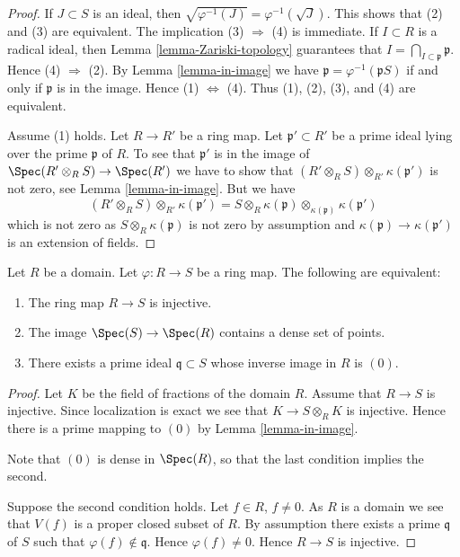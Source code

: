 \begin{proof}
If $J \subset S$ is an ideal, then
$\sqrt{\varphi^{-1}(J)} = \varphi^{-1}(\sqrt{J})$. This shows that (2)
and (3) are equivalent.
The implication (3) $\Rightarrow$ (4) is immediate.
If $I \subset R$ is a radical ideal, then
Lemma \ref{lemma-Zariski-topology}
guarantees that $I = \bigcap_{I \subset \mathfrak p} \mathfrak p$.
Hence (4) $\Rightarrow$ (2). By
Lemma \ref{lemma-in-image}
we have $\mathfrak p = \varphi^{-1}(\mathfrak p S)$ if and only if
$\mathfrak p$ is in the image. Hence (1) $\Leftrightarrow$ (4).
Thus (1), (2), (3), and (4) are equivalent.

\medskip\noindent
Assume (1) holds. Let $R \to R'$ be a ring map. Let
$\mathfrak p' \subset R'$ be a prime ideal lying over the prime
$\mathfrak p$ of $R$. To see that $\mathfrak p'$ is in the image
of $\Spec(R' \otimes_R S) \to \Spec(R')$ we have to show
that $(R' \otimes_R S) \otimes_{R'} \kappa(\mathfrak p')$ is not zero, see
Lemma \ref{lemma-in-image}.
But we have
$$
(R' \otimes_R S) \otimes_{R'} \kappa(\mathfrak p') =
S \otimes_R \kappa(\mathfrak p)
\otimes_{\kappa(\mathfrak p)} \kappa(\mathfrak p')
$$
which is not zero as $S \otimes_R \kappa(\mathfrak p)$ is not zero
by assumption and $\kappa(\mathfrak p) \to \kappa(\mathfrak p')$ is
an extension of fields.
\end{proof}

\begin{lemma}
\label{lemma-domain-image-dense-set-points-generic-point}
Let $R$ be a domain. Let $\varphi : R \to S$ be a ring map.
The following are equivalent:
\begin{enumerate}
\item The ring map $R \to S$ is injective.
\item The image $\Spec(S) \to \Spec(R)$
contains a dense set of points.
\item There exists a prime ideal $\mathfrak q \subset S$
whose inverse image in $R$ is $(0)$.
\end{enumerate}
\end{lemma}

\begin{proof}
Let $K$ be the field of fractions of the domain $R$.
Assume that $R \to S$ is injective. Since localization
is exact we see that $K \to S \otimes_R K$ is injective.
Hence there is a prime mapping to $(0)$ by
Lemma \ref{lemma-in-image}.

\medskip\noindent
Note that $(0)$ is dense in $\Spec(R)$, so that the
last condition implies the second.

\medskip\noindent
Suppose the second condition holds. Let $f \in R$,
$f \not = 0$. As $R$ is a domain we see that $V(f)$
is a proper closed subset of $R$. By assumption
there exists a prime $\mathfrak q$
of $S$ such that $\varphi(f) \not \in \mathfrak q$.
Hence $\varphi(f) \not = 0$.
Hence $R \to S$ is injective.
\end{proof}

